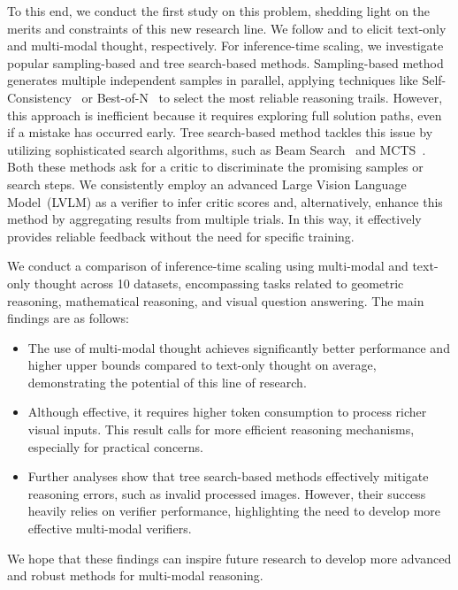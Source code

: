 To this end, we conduct the first study on this problem, shedding light on the merits and constraints of this new research line.
We follow \citet{cot} and \citet{vsk} to elicit text-only and multi-modal thought, respectively.
For inference-time scaling, we investigate popular sampling-based and tree search-based methods.
Sampling-based method generates multiple independent samples in parallel, applying techniques like Self-Consistency~\cite{tts2-Self-Consistency} or Best-of-N~\cite{tts-mcts1, tts-mcts3} to select the most reliable reasoning trails.
However, this approach is inefficient because it requires exploring full solution paths, even if a mistake has occurred early.
Tree search-based method tackles this issue by utilizing sophisticated search algorithms, such as Beam Search~\cite{tot} and MCTS~\cite{tts-mcts7}.
Both these methods ask for a critic to discriminate the promising samples or search steps.
We consistently employ an advanced Large Vision Language Model~(LVLM) as a verifier to infer critic scores and, alternatively, enhance this method by aggregating results from multiple trials.
In this way, it effectively provides reliable feedback without the need for specific training.

We conduct a comparison of inference-time scaling using multi-modal and text-only thought across 10 datasets, encompassing tasks related to geometric reasoning, mathematical reasoning, and visual question answering.
The main findings are as follows:
\begin{itemize}[leftmargin=12pt]
    \item The use of multi-modal thought achieves significantly better performance and higher upper bounds compared to text-only thought on average, demonstrating the potential of this line of research.
    \item Although effective, it requires higher token consumption to process richer visual inputs. This result calls for more efficient reasoning mechanisms, especially for practical concerns.
    \item Further analyses show that tree search-based methods effectively mitigate reasoning errors, such as invalid processed images. However, their success heavily relies on verifier performance, highlighting the need to develop more effective multi-modal verifiers.
\end{itemize}
We hope that these findings can inspire future research to develop more advanced and robust methods for multi-modal reasoning.


